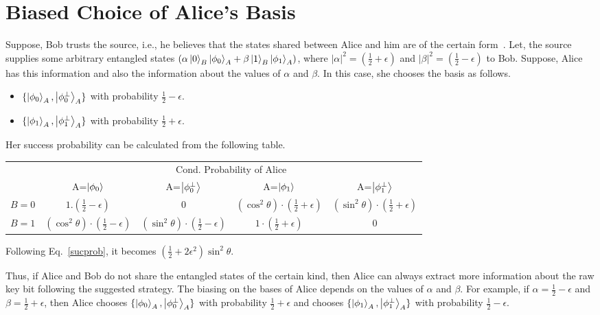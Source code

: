\documentclass[twocolumn,pra,aps,amssymb]{revtex4}
\begin{document}
\section{Biased Choice of Alice's Basis}
Suppose, Bob trusts the source, i.e., he believes that the states shared between Alice and him are of the certain form~\cite{Yang}. Let, the source supplies some arbitrary entangled states $(\alpha\left|0\right\rangle_{B}\left|\phi_0\right\rangle_{A}+\beta\left|1\right\rangle_{B}\left|\phi_1\right\rangle_{A})$, where $|\alpha|^2=(\frac{1}{2}+\epsilon)$ and
$|\beta|^2=(\frac{1}{2}-\epsilon)$ to Bob. Suppose, Alice has this information and also the information about the values of $\alpha$ and $\beta$. In this case, she chooses the basis as follows.
\begin{itemize}
\item $\{\left|\phi_0\right\rangle_{A}, \left|\phi_0^{\perp}\right\rangle_{A}\}$ with probability $\frac{1}{2}-\epsilon$.

\item $\{\left|\phi_1\right\rangle_{A}, \left|\phi_1^{\perp}\right\rangle_{A}\}$ with probability $\frac{1}{2}+\epsilon$.
\end{itemize}
 
Her success probability can be calculated from the following table.

{\tiny
\begin{center}
\begin{tabular}{|c|c|c|c|c|}
\hline
 & \multicolumn{4}{|c|}{Cond. Probability of Alice}\\
\cline{2-5}
& A=$\left|\phi_0\right\rangle$ & A=$\left|\phi_0^{\perp}\right\rangle$ & A=$\left|\phi_1\right\rangle$ & A=$\left|\phi_1^{\perp}\right\rangle$\\
\hline
$ B=0 $ &$ 1.(\frac{1}{2}-\epsilon)$& 0 &$(\cos^2\theta)\cdot\left(\frac{1}{2}+\epsilon\right)$ & $(\sin^2\theta)\cdot\left(\frac{1}{2}+\epsilon\right)$\\
\hline
$B=1$ & $(\cos^2\theta)\cdot\left(\frac{1}{2}-\epsilon\right)$ & $(\sin^2\theta)\cdot\left(\frac{1}{2}-\epsilon\right)$ &$1\cdot\left(\frac{1}{2}+\epsilon\right)$ & 0\\
\hline
\end{tabular}
\end{center}
}
Following Eq.~\eqref{sucprob}, it becomes
$(\frac{1}{2}+2\epsilon^2)\sin^2\theta$. 

Thus, if Alice and Bob do not share the entangled states of the certain kind, then Alice can always extract more information about the raw key bit following the suggested strategy. The biasing on the bases of Alice depends on the values of $\alpha$ and $\beta$. For example, if $\alpha=\frac{1}{2}-\epsilon$ and $\beta=\frac{1}{2}+\epsilon$, then Alice chooses $\{\left|\phi_0\right\rangle_{A}, \left|\phi_0^{\perp}\right\rangle_{A}\}$ with probability $\frac{1}{2}+\epsilon$ and chooses $\{\left|\phi_1\right\rangle_{A}, \left|\phi_1^{\perp}\right\rangle_{A}\}$ with probability $\frac{1}{2}-\epsilon$.
\end{document}
